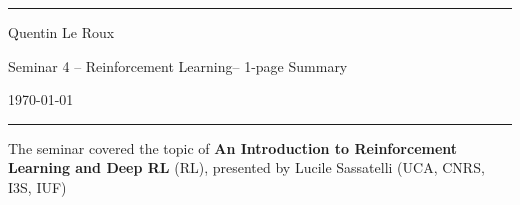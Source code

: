 \documentclass[a4paper]{article}
\begin{document}

\fancyhead[C]{}
\hrule \medskip %
\begin{minipage}{0.24\textwidth} 
\raggedright
\footnotesize
Quentin Le Roux \hfill
\end{minipage}
\begin{minipage}{0.5\textwidth} 
\centering 

Seminar 4 -- Reinforcement Learning-- 1-page Summary
\end{minipage}
\begin{minipage}{0.245\textwidth} 
\raggedleft
\today
\end{minipage}
\hrule 
\bigskip


The seminar covered the topic of \textbf{An Introduction to Reinforcement Learning and Deep RL} (RL), presented by Lucile Sassatelli (UCA, CNRS, I3S, IUF)
\end{document}
